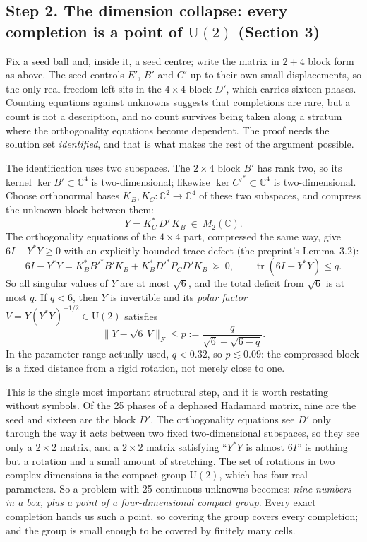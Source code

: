 \documentclass[11pt]{article}
\theoremstyle{definition}
\theoremstyle{plain}
\theoremstyle{definition}
\newcommand{\C}{\mathbb{C}}
\newcommand{\U}{\mathrm{U}}
\newcommand{\norm}[1]{\lVert #1\rVert}
\DeclareMathOperator{\tr}{tr}
\begin{document}
\subsection*{Step 2. The dimension collapse: every completion is a point of $\U(2)$ (Section 3)}

Fix a seed ball and, inside it, a seed centre; write the matrix in $2+4$ block form as above. The
seed controls $E'$, $B'$ and $C'$ up to their own small displacements, so the only real freedom left
sits in the $4\times4$ block $D'$, which carries sixteen phases. Counting equations against unknowns
suggests that completions are rare, but a count is not a description, and no count survives being
taken along a stratum where the orthogonality equations become dependent. The proof needs the solution
set \emph{identified}, and that is what makes the rest of the argument possible.

The identification uses two subspaces. The $2\times4$ block $B'$ has rank two, so its kernel
$\ker B'\subset\C^4$ is two-dimensional; likewise $\ker C'^*\subset\C^4$ is two-dimensional. Choose
orthonormal bases $K_B,K_C\colon\C^2\to\C^4$ of these two subspaces, and compress the unknown block
between them:
\[
Y=K_C^*\,D'\,K_B\ \in\ M_2(\C).
\]
The orthogonality equations of the $4\times4$ part, compressed the same way, give $6I-Y^*Y\ge0$ with
an explicitly bounded trace defect (the preprint's Lemma~3.2):
\[
6I-Y^*Y=K_B^*B'^*B'K_B+K_B^*D'^*P_C D'K_B\ \succeq\ 0,
\qquad
\tr(6I-Y^*Y)\le q .
\]
So all singular values of $Y$ are at most $\sqrt6$, and the total deficit from $\sqrt6$ is at most
$q$. If $q<6$, then $Y$ is invertible and its \emph{polar factor}
$V=Y(Y^*Y)^{-1/2}\in\U(2)$ satisfies
\[
\norm{Y-\sqrt6\,V}_{F}\le p:=\frac{q}{\sqrt6+\sqrt{6-q}} .
\]
In the parameter range actually used, $q<0.32$, so $p\lesssim 0.09$: the compressed block is a fixed
distance from a rigid rotation, not merely close to one.

\begin{ideabox}
This is the single most important structural step, and it is worth restating without symbols. Of the
25 phases of a dephased Hadamard matrix, nine are the seed and sixteen are the block $D'$. The
orthogonality equations see $D'$ only through the way it acts between two fixed two-dimensional
subspaces, so they see only a $2\times2$ matrix, and a $2\times2$ matrix satisfying ``$Y^*Y$ is
almost $6I$'' is nothing but a rotation and a small amount of stretching. The set of rotations in two
complex dimensions is the compact group $\U(2)$, which has four real parameters. So a problem with
25 continuous unknowns becomes: \emph{nine numbers in a box, plus a point of a four-dimensional
compact group}. Every exact completion hands us such a point, so covering the group covers every
completion; and the group is small enough to be covered by finitely many cells.
\end{ideabox}
\end{document}

